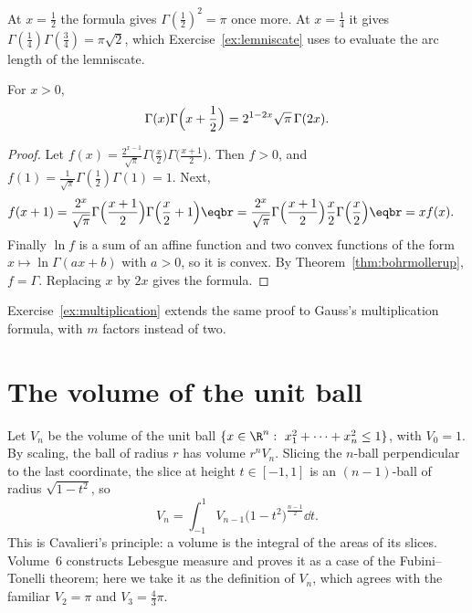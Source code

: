 At $x=\frac12$ the formula gives $\Gamma(\frac12)^2=\pi$ once more. At $x=\frac14$ it gives $\Gamma(\frac14)\Gamma(\frac34)=\pi\sqrt2$, which
Exercise~\ref{ex:lemniscate} uses to evaluate the arc length of the lemniscate.

\begin{theorem}\label{thm:duplication}
For $x>0$,
\[
\Gamma(x)\Gamma\Bigl(x+\frac12\Bigr)=2^{1-2x}\sqrt\pi\,\Gamma(2x).
\]
\end{theorem}
\begin{proof}
Let $f(x)=\frac{2^{x-1}}{\sqrt\pi}\Gamma\bigl(\frac x2\bigr)\Gamma\bigl(\frac{x+1}2\bigr)$. Then $f>0$, and $f(1)=\frac1{\sqrt\pi}\Gamma(\frac12)\Gamma(1)=1$.
Next,
\[
\begin{aligned}f(x+1)&=\frac{2^x}{\sqrt\pi}\Gamma\Bigl(\frac{x+1}2\Bigr)\Gamma\Bigl(\frac x2+1\Bigr)\eqbr=\frac{2^x}{\sqrt\pi}\Gamma\Bigl(\frac{x+1}2\Bigr)\frac x2\Gamma\Bigl(\frac x2\Bigr)\eqbr=xf(x).\end{aligned}
\]
Finally $\ln f$ is a sum of an affine function and two convex functions of the form $x\mapsto\ln\Gamma(ax+b)$ with $a>0$, so
it is convex. By Theorem~\ref{thm:bohrmollerup}, $f=\Gamma$. Replacing $x$ by $2x$ gives the formula.
\end{proof}

Exercise~\ref{ex:multiplication} extends the same proof to Gauss's multiplication formula, with $m$ factors instead of two.

\section{The volume of the unit ball}

Let $V_n$ be the volume of the unit ball $\{x\in\R^n:\ x_1^2+\cdots+x_n^2\le1\}$, with $V_0=1$. By scaling, the ball of radius $r$
has volume $r^nV_n$. Slicing the $n$-ball perpendicular to the last coordinate, the slice at height $t\in[-1,1]$ is an
$(n-1)$-ball of radius $\sqrt{1-t^2}$, so
\[
V_n=\int_{-1}^1V_{n-1}\bigl(1-t^2\bigr)^{\frac{n-1}2}\dd t.
\]
This is Cavalieri's principle: a volume is the integral of the areas of its slices. Volume~6 constructs Lebesgue measure and
proves it as a case of the Fubini--Tonelli theorem; here we take it as the definition of $V_n$, which agrees with the
familiar $V_2=\pi$ and $V_3=\frac43\pi$.

